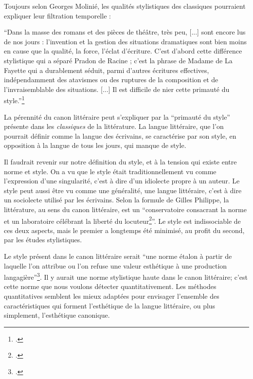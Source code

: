 Toujours selon Georges Molinié, les qualités stylistiques des classiques pourraient expliquer leur filtration temporelle : 

\begin{displayquote}
\enquote{Dans la masse des romans et des pièces de théâtre, très peu, [...] sont encore lus de nos jours : l'invention et la gestion des situations dramatiques sont bien moins en cause que la qualité, la force, l’éclat d’écriture. C’est d’abord cette différence stylistique qui a séparé Pradon de Racine ; c’est la phrase de Madame de La Fayette qui a durablement séduit, parmi d’autres écritures effectives, indépendamment des atavismes ou des ruptures de la composition et de l’invraisemblable des situations. [...] Il est difficile de nier cette primauté du style.}\footcites{molinie_style_1996}
\end{displayquote}

La pérennité du canon littéraire peut s'expliquer par la \enquote{primauté du style} présente dans les \textit{classiques} de la littérature. La langue littéraire, que l'on pourrait définir comme la langue des écrivains, se caractérise par son style, en opposition à la langue de tous les jours, qui manque de style. 

Il faudrait revenir sur notre définition du style, et à la tension qui existe entre norme et style. On a vu que le style était traditionnellement vu comme l'expression d'une singularité, c'est à dire d'un idiolecte propre à un auteur. Le style peut aussi être vu comme une généralité, une langue littéraire, c'est à dire un sociolecte utilisé par les écrivains. Selon la formule de Gilles Philippe, la littérature, au sens du canon littéraire, est un \enquote{conservatoire consacrant la norme et un laboratoire célébrant la liberté du locuteur\footcites{philippe_langue_2009}}. Le style est indissociable de ces deux aspects, mais le premier a longtemps été minimisé, au profit du second, par les études stylistiques. 

Le style présent dans le canon littéraire serait \enquote{une norme étalon à partir de laquelle l'on attribue ou l'on refuse une valeur esthétique à une production langagière}\footcites{philippe_pourquoi_2021}. Il y aurait une norme stylistique haute dans le canon littéraire; c'est cette norme que nous voulons détecter quantitativement. Les méthodes quantitatives semblent les mieux adaptées pour envisager l'ensemble des caractéristiques qui forment l'esthétique de la langue littéraire, ou plus simplement, l'esthétique canonique.

